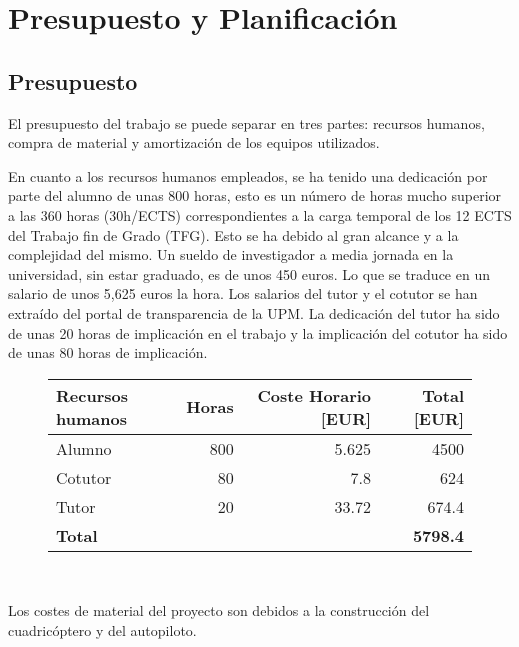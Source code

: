 \appendix
 
\chapter{Presupuesto y Planificación}

\section{Presupuesto}

El presupuesto del trabajo se puede separar en tres partes: recursos humanos, compra de material y amortización de los equipos utilizados.

En cuanto a los recursos humanos empleados, se ha tenido una dedicación por parte del alumno de unas 800 horas, esto es un número de horas mucho superior a las 360 horas (30h/ECTS) correspondientes a la carga temporal de los 12 ECTS del Trabajo fin de Grado (TFG). Esto se ha debido al gran alcance y a la complejidad del mismo. Un sueldo de investigador a media jornada en la universidad, sin estar graduado, es de unos 450 euros. Lo que se traduce en un salario de unos 5,625 euros la hora. Los salarios del tutor y el cotutor se han extraído del portal de transparencia de la UPM. La dedicación del tutor ha sido de unas 20 horas de implicación en el trabajo y la implicación del cotutor ha sido de unas 80 horas de implicación.
\begin{figure}[htb!]
		\centering
		\begin{tabular}{|l|r|r|r|}
		\hline
		
		\textbf{Recursos humanos} & Horas &Coste Horario [EUR]&Total [EUR]\\
		\hline
		
		Alumno & 800 & 5.625 &  4500 \\
		Cotutor & 80 & 7.8 & 624\\
		Tutor & 20& 33.72 & 674.4 \\
		\hline
		\textbf{Total} & &  & \textbf{5798.4}\\
		\hline
		\end{tabular}\\
	
\end{figure}

Los costes de material del proyecto son debidos a la construcción del cuadricóptero y del autopiloto.



